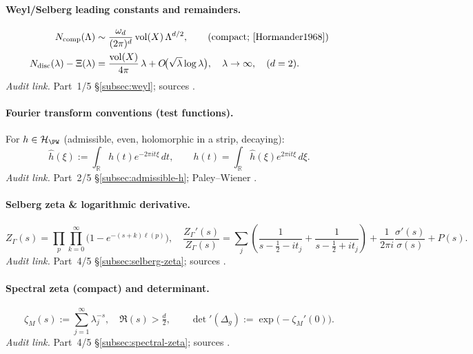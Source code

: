 \paragraph{Weyl/Selberg leading constants and remainders.}
\begin{align}
  N_{\mathrm{comp}}(\Lambda) &\sim \frac{\omega_d}{(2\pi)^d}\,\mathrm{vol}(X)\,\Lambda^{d/2}, 
  \qquad \text{(compact; \cite{Hormander1968})} \label{eq:weyl-compact} \\
  N_{\mathrm{disc}}(\lambda) - \Xi(\lambda)
  &= \frac{\mathrm{vol}(X)}{4\pi}\,\lambda + O\!\big(\sqrt{\lambda}\log \lambda\big), 
  \quad \lambda\to\infty, \quad (d=2). \label{eq:selberg-balanced}
\end{align}
\textit{Audit link.} Part~1/5 \S\ref{subsec:weyl}; sources \cite{Selberg1956,Hejhal1983,Hejhal1983II,LaxPhillips1976}.

\paragraph{Fourier transform conventions (test functions).}
For $h \in \mathcal H_{\PW}$ (admissible, even, holomorphic in a strip, decaying):
\begin{equation}
  \hat h(\xi) := \int_{\mathbb R} h(t) e^{-2\pi i t \xi}\,dt, 
  \qquad
  h(t) = \int_{\mathbb R} \hat h(\xi) e^{2\pi i t \xi}\,d\xi.
  \label{eq:fourier}
\end{equation}
\textit{Audit link.} Part~2/5 \S\ref{subsec:admissible-h}; Paley–Wiener \cite{PaleyWiener}.

\paragraph{Selberg zeta \& logarithmic derivative.}
\begin{equation}
  Z_\Gamma(s) = \prod_{p}\prod_{k=0}^{\infty}\big(1-e^{-(s+k)\ell(p)}\big),
  \quad
  \frac{Z_\Gamma'(s)}{Z_\Gamma(s)} = \sum_j\!\left(\frac{1}{s-\tfrac12-it_j}+\frac{1}{s-\tfrac12+it_j}\right)
  + \frac{1}{2\pi i}\frac{\sigma'(s)}{\sigma(s)} + P(s).
  \label{eq:Zprime}
\end{equation}
\textit{Audit link.} Part~4/5 \S\ref{subsec:selberg-zeta}; sources \cite{Selberg1956,Hejhal1983,Hejhal1983II}.

\paragraph{Spectral zeta (compact) and determinant.}
\begin{equation}
  \zeta_M(s) := \sum_{j=1}^{\infty} \lambda_j^{-s}, \quad \Re(s)>\tfrac d2,
  \qquad
  \det{}'(\Delta_g) := \exp\!\big(-\zeta_M'(0)\big).
  \label{eq:spectral-zeta-compact}
\end{equation}
\textit{Audit link.} Part~4/5 \S\ref{subsec:spectral-zeta}; sources \cite{Minakshisundaram1949,Seeley1967}.

